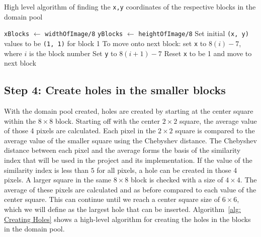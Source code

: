 \documentclass[10pt,twocolumn, a4paper]{witseiepaper}
\def\code#1{\texttt{#1}}
\begin{document}
\begin{algorithm}[h!]
\caption{High level algorithm of finding the \code{x,y} coordinates of the respective blocks in the domain pool}
\label{alg: Block index}
\begin{algorithmic}
\State \code{xBlocks} $\leftarrow$ \code{widthOfImage/8}
\State \code{yBlocks} $\leftarrow$ \code{heightOfImage/8}
\State Set initial \code{(x, y)} values to be \code{(1, 1)} for block 1
\State To move onto next block:
\State \quad set \code{x} to $8(i)-7$, where $i$ is the block number
\If{\code{BlockNumber > xBlocks}}
	\State Set \code{y} to $8(i+1)-7$
	\State Reset \code{x} to be 1 and move to next block
\EndIf
\end{algorithmic}
\end{algorithm}

\subsection{Step 4: Create holes in the smaller blocks}
\label{sec: Step 4}
With the domain pool created, holes are created by starting at the center square within the $8\times 8$ block. Starting off with the center $2\times 2$ square, the average value of those 4 pixels are calculated. Each pixel in the $2\times 2$ square is compared to the average value of the smaller square using the Chebyshev distance. The Chebyshev distance between each pixel and the average forms the basis of the similarity index that will be used in the project and its implementation. If the value of the similarity index is less than $5$ for all pixels, a hole can be created in those 4 pixels. A larger square in the same $8\times 8$ block is checked with a size of $4\times 4$. The average of these pixels are calculated and as before compared to each value of the center square. This can continue until we reach a center square size of $6\times 6$, which we will define as the largest hole that can be inserted. Algorithm~\ref{alg: Creating Holes} shows a high-level algorithm for creating the holes in the blocks in the domain pool.
\end{document}
